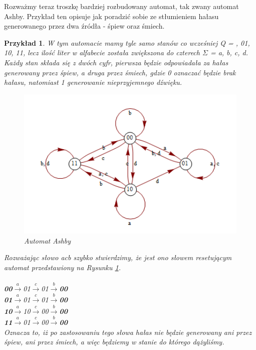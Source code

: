 \documentclass[12pt,a4paper]{article}
\newtheorem{pr}{Przyk{\l}ad}[section]
\begin{document}
Rozwa\.{z}my teraz troszk\k{e} bardziej rozbudowany automat, tak zwany automat Ashby. Przyk{\l}ad ten opisuje jak poradzi\'{c} sobie ze st{\l}umieniem ha{\l}asu generowanego przez dwa \'{z}r\'{o}d{\l}a - \'{s}piew oraz \'{s}miech.

\begin{pr}
W tym automacie mamy tyle samo stan\'{o}w co wcze\'{s}niej  Q = , 01, 10, 11\textbraceright, lecz ilo\'{s}\'{c} liter w alfabecie zosta{\l}a zwi\k{e}kszona do czterech $\Sigma$ = \textbraceleft a, b, c, d\textbraceright. Ka\.{z}dy stan sk{\l}ada si\k{e} z dw\'{o}ch cyfr, pierwsza b\k{e}dzie odpowiada{\l}a za ha{\l}as generowany przez \'{s}piew, a druga przez \'{s}miech, gdzie \textit{0} oznacza\'{c} b\k{e}dzie brak ha{\l}asu, natomiast \textit{1} generowanie nieprzyjemnego d\'{z}wi\k{e}ku.

\begin{figure}[H]
    \centering
    \includegraphics[width=1.05\textwidth]{rysunek2}
    \caption{Automat Ashby}
    \label{fig:rysunek2}
\end{figure}

Rozwa\.{z}aj\k{a}c s{\l}owo \textit{acb} szybko stwierdzimy, \.{z}e jest ono s{\l}owem resetuj\k{a}cym automat przedstawiony na Rysunku \ref{fig:rysunek2}.\\
\\
\textbf{00}$\xrightarrow{a}$01$\xrightarrow{c}$01$\xrightarrow{b}$\textbf{00}\\
\textbf{01}$\xrightarrow{a}$01$\xrightarrow{c}$01$\xrightarrow{b}$\textbf{00}\\
\textbf{10}$\xrightarrow{a}$10$\xrightarrow{c}$00$\xrightarrow{b}$\textbf{00}\\
\textbf{11}$\xrightarrow{a}$01$\xrightarrow{c}$00$\xrightarrow{b}$\textbf{00}\\

Oznacza to, i\.{z} po zastosowaniu tego s{\l}owa ha{\l}as nie b\k{e}dzie generowany ani przez \'{s}piew, ani przez \'{s}miech, a wi\k{e}c b\k{e}dziemy w stanie do kt\'{o}rego d\k{a}\.{z}yli\'{s}my.
\end{pr}
\end{document}
